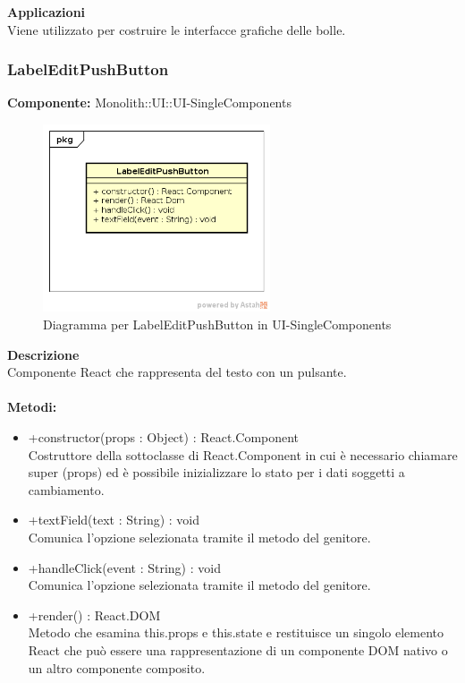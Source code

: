 \textbf{Applicazioni}\\
Viene utilizzato per costruire le interfacce grafiche delle bolle. 


\clearpage

\subsubsection{LabelEditPushButton}
\textbf{Componente:}  Monolith::UI::UI-SingleComponents\\
   \FloatBarrier
   \begin{figure}[ht]
   \centering
   \includegraphics[width=0.6\textwidth]{img/single-LabelEditPushButton}
   \caption{{Diagramma per LabelEditPushButton in UI-SingleComponents}}
\end{figure}
\FloatBarrier
\textbf{Descrizione}\\
Componente React che rappresenta del testo con un pulsante. \\\\
\textbf{Metodi:} \begin{itemize}\item +constructor(props : Object) : React.Component \\Costruttore della sottoclasse di React.Component in cui è necessario chiamare super (props) ed è possibile inizializzare lo stato per i dati soggetti a cambiamento.\item +textField(text : String) : void \\Comunica l’opzione selezionata tramite il metodo del genitore.\item +handleClick(event : String) : void  \\Comunica l’opzione selezionata tramite il metodo del genitore. \item +render() : React.DOM \\Metodo che esamina this.props e this.state e restituisce un singolo elemento React che può essere una rappresentazione di un componente DOM nativo o un altro componente composito.\end{itemize} 


